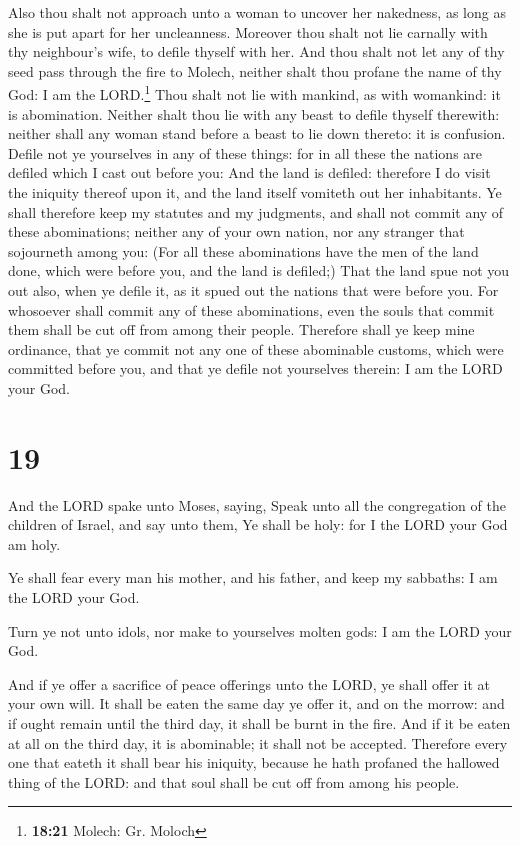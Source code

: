 Also thou shalt not approach unto a woman to uncover her
nakedness, as long as she is put apart for her uncleanness.
 Moreover thou shalt not lie carnally with thy
neighbour's wife, to defile thyself with her.  And thou
shalt not let any of thy seed pass through the fire to Molech, neither
shalt thou profane the name of thy God: I am the LORD.\footnote{\textbf{18:21}
  Molech: Gr. Moloch}  Thou shalt not lie with mankind,
as with womankind: it is abomination.  Neither shalt thou
lie with any beast to defile thyself therewith: neither shall any woman
stand before a beast to lie down thereto: it is confusion.
 Defile not ye yourselves in any of these things: for in
all these the nations are defiled which I cast out before you:
 And the land is defiled: therefore I do visit the
iniquity thereof upon it, and the land itself vomiteth out her
inhabitants.  Ye shall therefore keep my statutes and my
judgments, and shall not commit any of these abominations; neither any
of your own nation, nor any stranger that sojourneth among you:
 (For all these abominations have the men of the land
done, which were before you, and the land is defiled;) 
That the land spue not you out also, when ye defile it, as it spued out
the nations that were before you.  For whosoever shall
commit any of these abominations, even the souls that commit them shall
be cut off from among their people.  Therefore shall ye
keep mine ordinance, that ye commit not any one of these abominable
customs, which were committed before you, and that ye defile not
yourselves therein: I am the LORD your God.

\hypertarget{section-18}{%
\section{19}\label{section-18}}

 And the LORD spake unto Moses, saying, 
Speak unto all the congregation of the children of Israel, and say unto
them, Ye shall be holy: for I the LORD your God am holy.

 Ye shall fear every man his mother, and his father, and
keep my sabbaths: I am the LORD your God.

 Turn ye not unto idols, nor make to yourselves molten
gods: I am the LORD your God.

 And if ye offer a sacrifice of peace offerings unto the
LORD, ye shall offer it at your own will.  It shall be
eaten the same day ye offer it, and on the morrow: and if ought remain
until the third day, it shall be burnt in the fire.  And
if it be eaten at all on the third day, it is abominable; it shall not
be accepted.  Therefore every one that eateth it shall
bear his iniquity, because he hath profaned the hallowed thing of the
LORD: and that soul shall be cut off from among his people.

